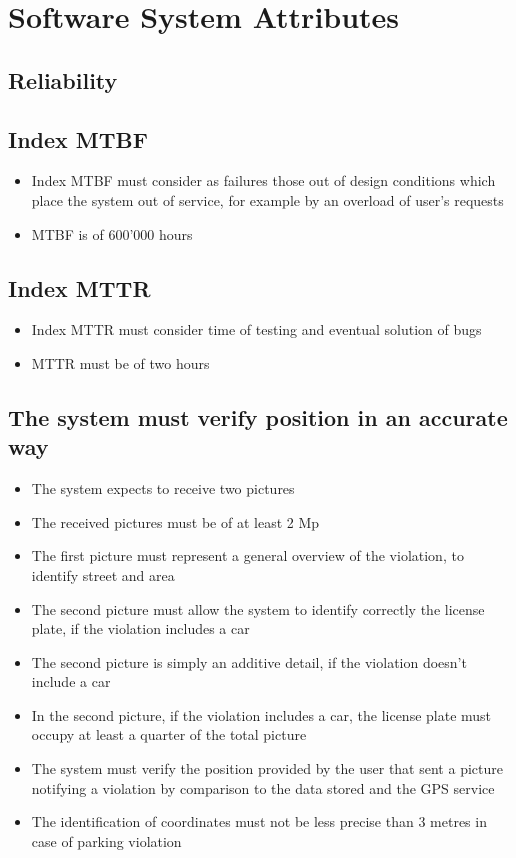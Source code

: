 \section{Software System Attributes}

\subsection{Reliability}
\subsection{Index MTBF}
\begin{itemize}
    \item Index MTBF must consider as failures those out of design conditions which place the system out of service, for example by an overload of user’s requests
    \item MTBF is of 600'000 hours
\end{itemize}

\subsection{Index MTTR}
\begin{itemize}
    \item Index MTTR must consider time of testing and eventual solution of bugs
    \item MTTR must be of two hours
\end{itemize}

\subsection{The system must verify position in an accurate way}
\begin{itemize}
    \item The system expects to receive two pictures			
    \item The received pictures must be of at least 2 Mp
    \item The first picture must represent a general overview of the violation, to identify street and area
    \item The second picture must allow the system to identify correctly the license plate, if the violation includes a car
    \item The second picture is simply an additive detail, if the violation doesn't include a car
    \item In the second picture, if the violation includes a car, the license plate must occupy at least a quarter of the total picture
    \item The system must verify the position provided by the user that sent a picture notifying a violation by comparison to the data stored and the GPS service
    \item The identification of coordinates must not be less precise than 3 metres in case of parking violation
\end{itemize}
\endsubsection

